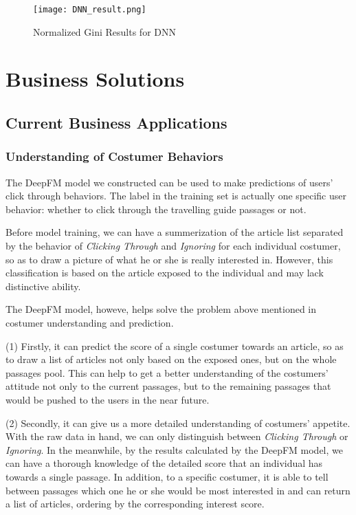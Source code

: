 \documentclass{article}
\begin{document}
    \begin{figure}[!h]
		\centering
		\texttt{[image: DNN\_result.png]}
		\caption{\small{Normalized Gini Results for DNN}}
		\label{fig:result_dnn}
	\end{figure}

    \newpage
    \section{Business Solutions}

    \subsection{Current Business Applications}
    
    \subsubsection{Understanding of Costumer Behaviors}
    The DeepFM model we constructed can be used to make predictions of users' click through behaviors. The label in the training set is actually one specific user behavior: whether to click through the travelling guide passages or not. 

    Before model training, we can have a summerization of the article list separated by the behavior of \emph{Clicking Through} and \emph{Ignoring} for each individual costumer, so as to draw a picture of what he or she is really interested in. However, this classification is based on the article exposed to the individual and may lack distinctive ability. 

    The DeepFM model, howeve, helps solve the problem above mentioned in costumer understanding and prediction.

    (1) Firstly, it can predict the score of a single costumer towards an article, so as to draw a list of articles not only based on the exposed ones, but on the whole passages pool. This can help to get a better understanding of the costumers' attitude not only to the current passages, but to the remaining passages that would be pushed to the users in the near future.

    (2) Secondly, it can give us a more detailed understanding of costumers' appetite. With the raw data in hand, we can only distinguish between \emph{Clicking Through} or \emph{Ignoring}. In the meanwhile, by the results calculated by the DeepFM model, we can have a thorough knowledge of the detailed score that an individual has towards a single passage. In addition, to a specific costumer, it is able to tell between passages which one he or she would be most interested in and can return a list of articles, ordering by the corresponding interest score.   
\end{document}
